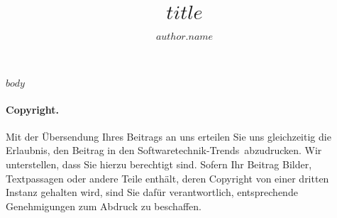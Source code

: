 \documentclass[
    $if(classoption)$
    $for(classoption)$$classoption$$sep$,$endfor$
    $endif$
]{$documentclass$}
\title{$title$}
\author[$author.index$]{$author.name$\thinspace\orcidlink{$author.orcid$}\thinspace}
\affil[$author.index$]{$author.affiliation$\thinspace}
\date{}
\newcommand{\stt}{Soft\-ware\-tech\-nik-Trends}
\begin{document}
    \maketitle



    $body$

\paragraph{Copyright.}

Mit der Übersendung Ihres Beitrags an uns erteilen Sie uns gleichzeitig die Erlaubnis,
den Beitrag in den \stt\ abzudrucken. Wir unterstellen, dass Sie hierzu berechtigt sind.
Sofern Ihr Beitrag Bilder, Textpassagen oder andere Teile enthält, deren Copyright
von einer dritten Instanz gehalten wird, sind Sie dafür verantwortlich,
entsprechende Genehmigungen zum Abdruck zu beschaffen.


\printbibliography
\end{document}
